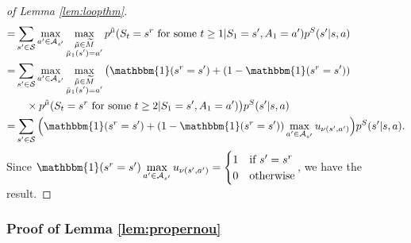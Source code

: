 \documentclass{amsart}
\begin{document}
\begin{proof}[of Lemma \ref{lem:loopthm}]
\begin{align*}
=& \sum_{s^\prime \in \mathcal{S}} \max_{a^\prime \in \mathcal{A}_{s^\prime}} \max_{\substack{\tilde{\mu} \in \widetilde{M}\\ \tilde{\mu}_1(s^\prime) = a^\prime}} p^{\tilde{\mu}}(S_t=s^r \text{ for some } t \geq 1 | S_1=s^\prime, A_1 = a^\prime) p^S(s^\prime|s,a) \\
=& \sum_{s^\prime \in \mathcal{S}} \max_{a^\prime \in \mathcal{A}_{s^\prime}} \max_{\substack{\tilde{\mu} \in \widetilde{M}\\ \tilde{\mu}_1(s^\prime) = a^\prime}} \big(\mathbbm{1}(s^r = s^\prime) + (1-\mathbbm{1}(s^r = s^\prime))\\
&\quad \times p^{\tilde{\mu}}(S_t=s^r \text{ for some } t \geq 2 | S_1=s^\prime, A_1 =a^\prime)\big) p^S(s^\prime|s,a) \\
=& \sum_{s^\prime \in \mathcal{S}} \Big(\mathbbm{1}(s^r = s^\prime) + (1-\mathbbm{1}(s^r = s^\prime)) \max_{a^\prime \in \mathcal{A}_{s^\prime}} u_{\nu(s^\prime, a^\prime)}\Big) p^S(s^\prime|s,a).
\end{align*}
Since $\mathbbm{1}(s^r = s^\prime) \max\limits_{a^\prime \in \mathcal{A}_{s^\prime}} u_{\nu(s^\prime, a^\prime)} = \begin{cases} 1& \text{if } s^\prime = s^r \\ 0 & \text{otherwise} \end{cases}$,  we have the result.
\end{proof}




\subsubsection{Proof of Lemma \ref{lem:propernou}}\label{apd:lem:propernou}
\end{document}
